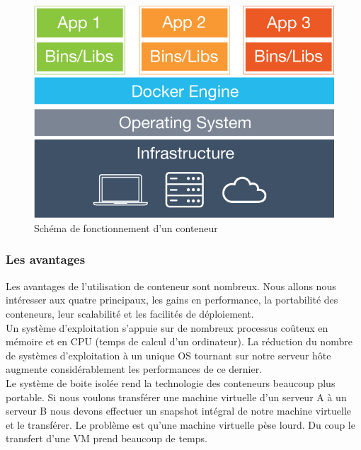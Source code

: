       \begin{figure}
        \begin{center}
          \includegraphics[scale=0.2]{images/container.png}
        \end{center}
        \caption{Schéma de fonctionnement d'un conteneur}
        \label{Container}
      \end{figure}

      \subsubsection{Les avantages}
      Les avantages de l’utilisation de conteneur sont nombreux. Nous allons nous intéresser aux quatre principaux, les gains en performance, la portabilité des conteneurs, leur scalabilité et les facilités de déploiement.\\

      Un système d’exploitation s’appuie sur de nombreux processus coûteux en mémoire et en CPU (temps de calcul d’un ordinateur). La réduction du nombre de systèmes d’exploitation à un unique OS tournant sur notre serveur hôte augmente considérablement les performances de ce dernier.\\

      Le système de boite isolée rend la technologie des conteneurs beaucoup plus portable. Si nous voulons transférer une machine virtuelle d’un serveur A à un serveur B nous devons effectuer un snapshot intégral de notre machine virtuelle et le transférer. Le problème est qu’une machine virtuelle pèse lourd. Du coup le transfert d’une VM prend beaucoup de temps.\\

